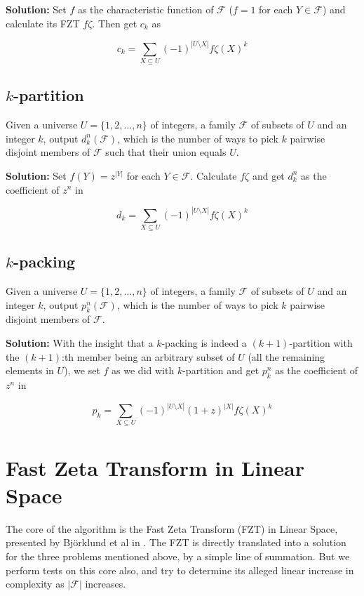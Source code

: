 \documentclass[a4paper, titlepage]{article}
\begin{document}
\textbf{Solution:} Set $f$ as the characteristic function of $\mathcal{F}$ ($f = 1$ for each $Y \in \mathcal{F}$) and calculate its FZT $f\zeta$. Then get $c_k$ as

$$
c_k = \sum_{X\subseteq U} (-1)^{|U \setminus X|}f\zeta(X)^k
$$

\subsection{$k$-partition}
Given a universe $U = \{1, 2, \ldots, n\}$ of integers, a family $\mathcal{F}$ of subsets of $U$ and an integer $k$, output $d_k^n(\mathcal{F})$, which is the number of ways to pick $k$ pairwise disjoint members of $\mathcal{F}$ such that their union equals $U$.

\textbf{Solution:} Set $f(Y) = z^{|Y|}$ for each $Y \in \mathcal{F}$. Calculate $f\zeta$ and get $d_k^n$ as the coefficient of $z^n$ in

$$
d_k = \sum_{X\subseteq U} (-1)^{|U \setminus X|}f\zeta(X)^k
$$

\subsection{$k$-packing}
Given a universe $U = \{1, 2, \ldots, n\}$ of integers, a family $\mathcal{F}$ of subsets of $U$ and an integer $k$, output $p_k^n(\mathcal{F})$, which is the number of ways to pick $k$ pairwise disjoint members of $\mathcal{F}$.

\textbf{Solution:} With the insight that a $k$-packing is indeed a $(k+1)$-partition with the $(k+1)$:th member being an arbitrary subset of $U$ (all the remaining elements in $U$), we set $f$ as we did with $k$-partition and get $p_k^n$ as the coefficient of $z^n$ in

$$
p_k = \sum_{X\subseteq U} (-1)^{|U \setminus X|} (1+z)^{|X|} f\zeta(X)^k
$$

\section{Fast Zeta Transform in Linear Space} \label{fztlin}
The core of the algorithm is the Fast Zeta Transform (FZT) in Linear Space, presented by Björklund et al in \cite{cov_pack}. The FZT is directly translated into a solution for the three problems mentioned above, by a simple line of summation. But we perform tests on this core also, and try to determine its alleged linear increase in complexity as $|\mathcal{F}|$ increases.
\end{document}

